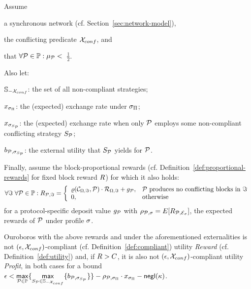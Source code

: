 \begin{theorem}\label{thm:penalties-ouroboros}
    Assume
    \begin{inparaenum}[i)]
        \item a synchronous network (cf. Section~\ref{sec:network-model}),
        \item the conflicting predicate $\mathcal{X}_{conf}$, and
        \item that $\forall \mathcal{P} \in \mathbb{P}: \mu_{\mathcal{P}} <$~$\frac{1}{2}$.
    \end{inparaenum}
    Also let:
    \begin{inparaenum}[i)]
        \item $\mathbb{S}_{-\mathcal{X}_{conf}}$: the set of all non-compliant strategies;
        \item $x_{\sigma_\Pi}$: the (expected) exchange rate under $\sigma_\Pi$;
        \item $x_{\sigma_{S_{\mathcal{P}}}}$: the (expected) exchange rate when only $\mathcal{P}$ employs some non-compliant conflicting strategy $S_{\mathcal{P}}$;
        \item $b_{\mathcal{P}, \sigma_{S_{\mathcal{P}}}}$: the external utility that $S_{\mathcal{P}}$ yields for $\mathcal{P}$.
    \end{inparaenum}
    Finally, assume the block-proportional rewards (cf.
    Definition~\ref{def:proportional-rewards} for fixed block reward $R$)
    for which it also holds:
    $$
    \forall \Im \; \forall \mathcal{P} \in \mathbb{P}: R_{\mathcal{P}, \Im} =
    \left\{
    \begin{array}{ll}
        \varrho(\mathcal{C}_{\Omega,\Im}, \mathcal{P}) \cdot \mathcal{R}_{\Omega,\Im} + g_{\mathcal{P}},&\mathcal{P} \mbox{ produces no conflicting blocks in } \Im\\
        0,&\mbox{otherwise}
    \end{array}
    \right.$$
    for a protocol-specific deposit value $g_{\mathcal{P}}$ with
    $\rho_{\mathcal{P}, \sigma} = E[R_{\mathcal{P},
    \mathcal{E}_{\sigma}}]$, \ie the expected rewards of $\mathcal{P}$ under
    profile $\sigma$.

    Ouroboros with the above rewards and under the aforementioned externalities
    is not $(\epsilon, \mathcal{X}_{conf})$-compliant (cf.
    Definition~\ref{def:compliant}) \wrt utility \emph{Reward} (cf.
    Definition~\ref{def:utility}) and, if $R > C$, it is also not
    $(\epsilon, \mathcal{X}_{conf})$-compliant \wrt utility \emph{Profit},
    in both cases for a bound
    $\epsilon < \underset{\mathcal{P} \in \mathbb{P}}{\mathsf{max}}\{ \underset{S_{\mathcal{P}} \in \mathbb{S}_{-\mathcal{X}_{conf}}}{\mathsf{max}}\{ b_{\mathcal{P}, \sigma_{S_{\mathcal{P}}}} \} \} - \rho_{\mathcal{P}, \sigma_{\Pi}} \cdot x_{\sigma_\Pi} - \mathsf{negl}(\kappa)$.
\end{theorem}
